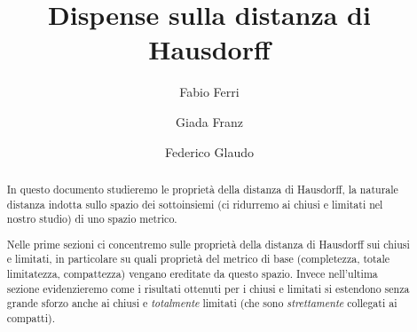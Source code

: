 \documentclass[a4paper,12pt]{article}
\title{Dispense sulla distanza di Hausdorff}
\author{Fabio Ferri \and Giada Franz \and Federico Glaudo}
\begin{document}
\maketitle


\begin{abstract}
	In questo documento studieremo le proprietà della distanza di Hausdorff, la naturale distanza indotta sullo spazio dei sottoinsiemi (ci ridurremo ai chiusi e limitati nel nostro studio) di uno spazio metrico. 
	
	Nelle prime sezioni ci concentremo sulle proprietà della distanza di Hausdorff sui chiusi e limitati, in particolare su quali proprietà del metrico di base (completezza, totale limitatezza, compattezza) vengano ereditate da questo spazio. 
	Invece nell'ultima sezione evidenzieremo come i risultati ottenuti per i chiusi e limitati si estendono senza grande sforzo anche ai chiusi e \emph{totalmente} limitati (che sono \emph{strettamente} collegati ai compatti).
\end{abstract}
\clearpage





\end{document}
